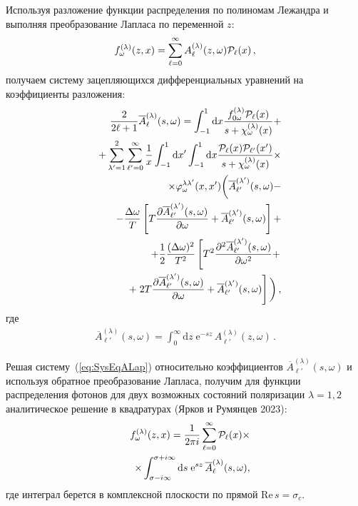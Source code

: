 \documentclass{pazh2col-win}
\newcommand{\dd}{\mathrm{d}} %
\newcommand{\eee}{\mathrm{e}} %
\begin{document}
Используя разложение функции распределения по полиномам Лежандра и выполняя преобразование Лапласа по переменной $z$:
%
\begin{equation}
f_\omega^{(\lambda)}(z,x) = \sum_{\ell=0}^{\infty} A_\ell^{(\lambda)}(z,\omega) {\cal P}_\ell(x)\, ,
\end{equation}
%
получаем систему зацепляющихся дифференциальных уравнений на коэффициенты разложения:
\begin{eqnarray}
\label{eq:SysEqALap}
\nonumber
&&\frac{2}{2 \ell +1} \overline{A}_\ell^{(\lambda)}(s,\omega) = \int_{-1}^{1} \dd x\frac{f_{0\omega}^{(\lambda)} {\cal P}_\ell(x)}{s+{\cal \chi}^{(\lambda)}_\omega(x)}+
\\
\nonumber
&&+ \sum_{\lambda'=1}^{2}\sum_{\ell'=0}^{\infty}\frac{1}{x}\int_{-1}^{1}\dd x'\int_{-1}^{1}\dd x \frac{{\cal P}_\ell(x) {\cal P}_{\ell'}(x')}{s+{\cal \chi}_\omega^{(\lambda)}(x)} \times
\\
\nonumber
&&\times\varphi_\omega^{\lambda\lambda'}(x,x') \bigg(\overline{A}_{\ell'}^{(\lambda')}(s,\omega) -
\\
\nonumber
&&- \frac{\Delta \omega}{T}
\left[T \frac{\partial \overline{A}_{\ell'}^{(\lambda')}(s,\omega)}{\partial \omega} + \overline{A}_{\ell'}^{(\lambda')}(s,\omega)\right]+
\\
\nonumber
&&+ \frac{1}{2}\frac{(\Delta \omega)^2}{T^2}\left[	T^2 \frac{\partial^2 \overline{A}_{\ell'}^{(\lambda')}(s,\omega)}{\partial \omega^2} + \right.
\\
&&+\left. 2T \frac{\partial \overline{A}_{\ell'}^{(\lambda')}(s,\omega)}{\partial \omega}+\overline{A}_{\ell'}^{(\lambda')}(s,\omega)	\right]\bigg)\, ,
\end{eqnarray}
%
где
\begin{eqnarray}
\label{lapA}
\overline{A}_{\ell'}^{(\lambda)}(s,\omega)=\int_{0}^{\infty} \dd z\;\eee^{-sz} \,A^{(\lambda)}_{\ell'}(z,\omega) \,.
\end{eqnarray}
%

Решая систему~(\ref{eq:SysEqALap}) относительно коэффициентов $\overline{A}_{\ell'}^{(\lambda)}(s,\omega)$ и используя обратное преобразование Лапласа, получим для функции распределения фотонов для двух возможных состояний поляризации $\lambda = 1,2$ аналитическое решение в квадратурах (Ярков и Румянцев 2023):
%
\begin{eqnarray}
\label{f_sol}
\nonumber
&&f_\omega^{(\lambda)}(z,x) = 
\frac{1}{2\pi i}\sum_{\ell=0}^{\infty} {\cal P}_\ell(x) \times
\\
&&\times\int_{\sigma-i\infty}^{\sigma + i \infty}\dd s \; \eee^{sz} \,\overline{A}^{(\lambda)}_\ell(s,\omega),
\end{eqnarray}
%
где интеграл берется в комплексной плоскости по прямой $\mathrm{Re} \, s = \sigma_c$.
\end{document}
